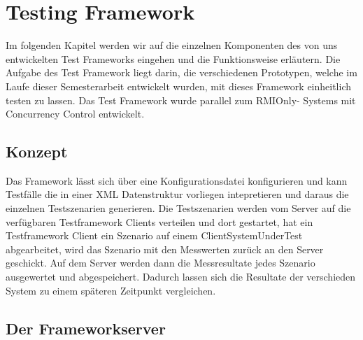 \section{Testing Framework}
\label{sec:testing Framework}
Im folgenden Kapitel werden wir auf die einzelnen Komponenten des von uns entwickelten Test Frameworks eingehen und die Funktionsweise erläutern. Die Aufgabe des Test Framework liegt darin, die verschiedenen Prototypen, welche im Laufe dieser Semesterarbeit entwickelt wurden, mit dieses Framework einheitlich testen zu lassen. Das Test Framework wurde parallel zum RMIOnly- Systems mit Concurrency Control entwickelt.

\subsection{Konzept}
Das Framework lässt sich über eine Konfigurationsdatei konfigurieren und kann Testfälle die in einer XML Datenstruktur vorliegen intepretieren und daraus die einzelnen Testszenarien generieren. Die Testszenarien werden vom Server auf die verfügbaren Testframework Clients verteilen und dort gestartet, hat ein Testframework Client ein Szenario auf einem ClientSystemUnderTest abgearbeitet, wird das Szenario mit den Messwerten zurück an den Server geschickt. Auf dem Server werden dann die Messresultate jedes Szenario ausgewertet und abgespeichert. Dadurch lassen sich die Resultate der verschieden System zu einem späteren Zeitpunkt vergleichen.


\subsection{Der Frameworkserver}
\label{sec:test-FW Server}
